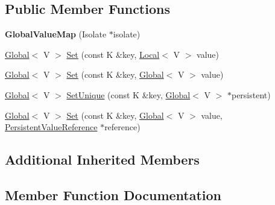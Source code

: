 \subsection*{Public Member Functions}
\begin{DoxyCompactItemize}
\item 
\mbox{\label{classv8_1_1GlobalValueMap_a60018c72fdae03d51b687d2a941140f4}} 
{\bfseries Global\+Value\+Map} (Isolate $\ast$isolate)
\item 
\mbox{\hyperlink{classv8_1_1Global}{Global}}$<$ V $>$ \mbox{\hyperlink{classv8_1_1GlobalValueMap_aa13f7914642c705b8e96824747ea115a}{Set}} (const K \&key, \mbox{\hyperlink{classv8_1_1Local}{Local}}$<$ V $>$ value)
\item 
\mbox{\hyperlink{classv8_1_1Global}{Global}}$<$ V $>$ \mbox{\hyperlink{classv8_1_1GlobalValueMap_ac2b02a0105393e6e3ab7e0aeeed9a294}{Set}} (const K \&key, \mbox{\hyperlink{classv8_1_1Global}{Global}}$<$ V $>$ value)
\item 
\mbox{\hyperlink{classv8_1_1Global}{Global}}$<$ V $>$ \mbox{\hyperlink{classv8_1_1GlobalValueMap_aad73de3912571a2f245454d3edea4a41}{Set\+Unique}} (const K \&key, \mbox{\hyperlink{classv8_1_1Global}{Global}}$<$ V $>$ $\ast$persistent)
\item 
\mbox{\hyperlink{classv8_1_1Global}{Global}}$<$ V $>$ \mbox{\hyperlink{classv8_1_1GlobalValueMap_aaa5fa26f751c8608716ad5578cd6c1d0}{Set}} (const K \&key, \mbox{\hyperlink{classv8_1_1Global}{Global}}$<$ V $>$ value, \mbox{\hyperlink{classv8_1_1PersistentValueMapBase_1_1PersistentValueReference}{Persistent\+Value\+Reference}} $\ast$reference)
\end{DoxyCompactItemize}
\subsection*{Additional Inherited Members}


\subsection{Member Function Documentation}
\mbox{\label{classv8_1_1GlobalValueMap_aa13f7914642c705b8e96824747ea115a}} 
